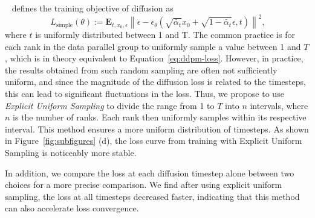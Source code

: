 ~\citet{ho2020denoising} defines the training objective of diffusion as 
\begin{equation}~\label{eq:ddpm-loss}
    L_\mathrm{simple}(\theta) := \mathbf{E}_{t, x_0, \epsilon}{ \left\| \epsilon - \epsilon_\theta(\sqrt{\bar\alpha_t} x_0 + \sqrt{1-\bar\alpha_t}\epsilon, t) \right\|^2},
\end{equation}
where $t$ is uniformly distributed between 1 and T. 
The common practice is for each rank in the data parallel group to uniformly sample a value between 1 and $T$, which is in theory equivalent to Equation~\ref{eq:ddpm-loss}. 
However, in practice, the results obtained from such random sampling are often not sufficiently uniform, and since the magnitude of the diffusion loss is related to the timesteps, this can lead to significant fluctuations in the loss. 
Thus, we propose to use \textit{Explicit Uniform Sampling} to divide the range from 1 to $T$ into $n$ intervals, where $n$ is the number of ranks. 
Each rank then uniformly samples within its respective interval. 
This method ensures a more uniform distribution of timesteps. 
As shown in Figure~\ref{fig:subfigures} (d), the loss curve from training with Explicit Uniform Sampling is noticeably more stable. 

In addition, we compare the loss at each diffusion timestep alone between two choices for a more precise comparison. We find after using explicit uniform sampling, the loss at all timesteps decreased faster, indicating that this method can also accelerate loss convergence.